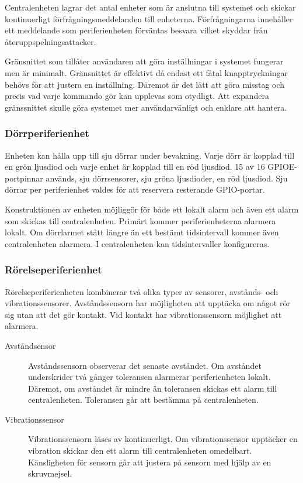 \documentclass[a4paper]{article}
\begin{document}
Centralenheten lagrar det antal enheter som är anslutna till systemet och skickar kontinuerligt förfrågningsmeddelanden till enheterna.
Förfrågningarna innehåller ett meddelande som periferienheten förväntas besvara vilket skyddar från återuppspelningsattacker.

Gränsnittet som tillåter användaren att göra inställningar i systemet fungerar men är minimalt.
Gränsnittet är effektivt då endast ett fåtal knapptryckningar behövs för att justera en inställning.
Däremot är det lätt att göra misstag och precis vad varje kommando gör kan upplevas som otydligt.
Att expandera gränssnittet skulle göra systemet mer användarvänligt och enklare att hantera.

\subsubsection{Dörrperiferienhet}
Enheten kan hålla upp till sju dörrar under bevakning.
Varje dörr är kopplad till en grön ljusdiod och varje enhet är kopplad till en röd ljusdiod.
15 av 16 GPIOE-portpinnar används, sju dörrsensorer, sju gröna ljusdioder, en röd ljusdiod.
Sju dörrar per periferienhet valdes för att reservera resterande GPIO-portar.

Konstruktionen av enheten möjliggör för både ett lokalt alarm och även ett alarm som skickas till centralenheten.
Primärt kommer periferienheterna alarmera lokalt.
Om dörrlarmet stått längre än ett bestämt tidsintervall kommer även centralenheten alarmera.
I centralenheten kan tidsintervaller konfigureras.

\subsubsection{Rörelseperiferienhet}
Rörelseperiferienheten kombinerar två olika typer av sensorer, avstånds- och vibrationssensorer.
Avståndssensorn har möjligheten att upptäcka om något rör sig utan att det gör kontakt.
Vid kontakt har vibrationssensorn möjlighet att alarmera.

\begin{description}
  \item[Avståndsensor] Avståndssensorn observerar det senaste avståndet.
  Om avståndet underskrider två gånger toleransen alarmerar periferienheten lokalt.
  Däremot, om avståndet är mindre än toleransen skickas ett alarm till centralenheten.
  Toleransen går att bestämma på centralenheten.

  \item[Vibrationssensor] Vibrationssensorn läses av kontinuerligt.
  Om vibrationssensor upptäcker en vibration skickar den ett alarm till centralenheten omedelbart.
  Känsligheten för sensorn går att justera på sensorn med hjälp av en skruvmejsel.

  \end{description}
\end{document}
